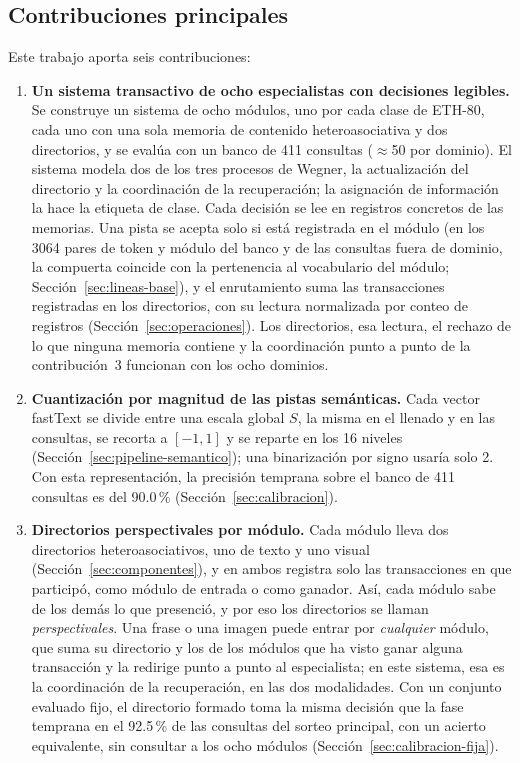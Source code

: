 \subsection*{Contribuciones principales}

Este trabajo aporta seis contribuciones:

\begin{enumerate}
    \item \textbf{Un sistema transactivo de ocho especialistas con decisiones legibles.}
    Se construye un sistema de ocho módulos, uno por cada clase de ETH-80, cada uno con
    una sola memoria de contenido heteroasociativa y dos directorios, y se evalúa con un
    banco de 411 consultas ($\approx$50 por dominio).
    El sistema modela dos de los tres procesos de Wegner, la actualización del
    directorio y la coordinación de la recuperación; la asignación de información la
    hace la etiqueta de clase.
    Cada decisión se lee en registros concretos de las memorias.
    Una pista se acepta solo si está registrada en el módulo (en los 3064 pares de token
    y módulo del banco y de las consultas fuera de dominio, la compuerta coincide con la
    pertenencia al vocabulario del módulo; Sección~\ref{sec:lineas-base}), y el
    enrutamiento suma las transacciones registradas en los directorios, con su lectura
    normalizada por conteo de registros (Sección~\ref{sec:operaciones}).
    Los directorios, esa lectura, el rechazo de lo que ninguna memoria contiene y la
    coordinación punto a punto de la contribución~3 funcionan con los ocho dominios.

    \item \textbf{Cuantización por magnitud de las pistas semánticas.}
    Cada vector fastText se divide entre una escala global $S$, la misma en el llenado y
    en las consultas, se recorta a $[-1, 1]$ y se reparte en los 16 niveles
    (Sección~\ref{sec:pipeline-semantico}); una binarización por signo usaría solo 2.
    Con esta representación, la precisión temprana sobre el banco de 411 consultas es del
    90.0\,\% (Sección~\ref{sec:calibracion}).

    \item \textbf{Directorios perspectivales por módulo.}
    Cada módulo lleva dos directorios heteroasociativos, uno de texto y uno visual
    (Sección~\ref{sec:componentes}), y en ambos registra solo las transacciones en que
    participó, como módulo de entrada o como ganador.
    Así, cada módulo sabe de los demás lo que presenció, y por eso los directorios se
    llaman \emph{perspectivales}.
    Una frase o una imagen puede entrar por \emph{cualquier} módulo, que suma su
    directorio y los de los módulos que ha visto ganar alguna transacción y la redirige
    punto a punto al especialista; en este sistema, esa es la coordinación de la
    recuperación, en las dos modalidades.
    Con un conjunto evaluado fijo, el directorio formado toma la misma decisión que la
    fase temprana en el 92.5\,\% de las consultas del sorteo principal, con un acierto
    equivalente, sin consultar a los ocho módulos (Sección~\ref{sec:calibracion-fija}).


\end{enumerate}
